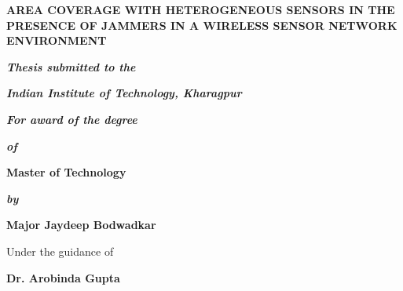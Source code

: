 \thispagestyle{empty}
\begin{center}
 \textbf{\large AREA COVERAGE WITH HETEROGENEOUS SENSORS IN THE PRESENCE OF JAMMERS IN A WIRELESS SENSOR NETWORK ENVIRONMENT}
\end{center}
 \vspace{-2.5em}
 \vspace{2em}
\begin{center}
 \textbf{\textit{Thesis submitted to the}}
\end{center}
 \vspace{-3em}
\begin{center}
 \textbf{\textit{Indian Institute of Technology, Kharagpur}} 
\end{center}
 \vspace{-3em}
\begin{center}
 \textbf{\textit{For award of the degree}} 
\end{center}
 \vspace{-1em}
\begin{center}
 \textbf{\textit{of}}
\end{center}
 \vspace{-1em}
\begin{center}
 \textbf{\large Master of Technology}
\end{center}
 \vspace{-1em}
\begin{center}
 \textbf{\textit{by}}
\end{center}
 \vspace{-1em}
\begin{center}
 \large{\textbf{Major Jaydeep Bodwadkar}}
\end{center}
 \vspace{-1em}
\begin{center}
 Under the guidance of
\end{center}
 \vspace{-1em}
\begin{center}
 \textbf{Dr. Arobinda Gupta}
\end{center}
 \vspace{-1em}
